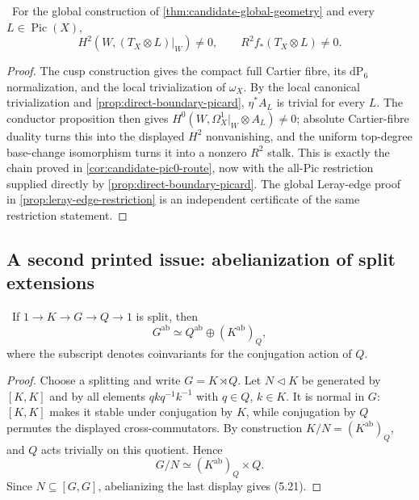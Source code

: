 \begin{corollary}
\label{cor:candidate-conductor-actual}
\Verified\ For the global construction of
\cref{thm:candidate-global-geometry} and every
$L\in\operatorname{Pic}(X)$,
\[
H^2(W,(T_X\otimes L)|_W)\ne0,
\qquad R^2f_*(T_X\otimes L)\ne0.
\]
\end{corollary}

\begin{proof}
The cusp construction gives the compact full Cartier fibre, its
$\mathrm{dP}_6$ normalization, and the local trivialization of $\omega_X$.
By the local canonical trivialization and
\cref{prop:direct-boundary-picard}, $\eta^*A_L$ is trivial for every $L$.
The conductor proposition then gives
$H^0(W,\Omega_X^1|_W\otimes A_L)\ne0$; absolute Cartier-fibre duality turns
this into the displayed $H^2$ nonvanishing, and the uniform top-degree
base-change isomorphism turns it into a nonzero $R^2$ stalk.  This is exactly
the chain proved in \cref{cor:candidate-pic0-route}, now with the all-Pic
restriction supplied directly by \cref{prop:direct-boundary-picard}.  The
global Leray-edge proof in \cref{prop:leray-edge-restriction} is an
independent certificate of the same restriction statement.
\end{proof}

\subsection{A second printed issue: abelianization of split extensions}

\begin{lemma}
\label{lem:semidirect-abelianization}
\Verified\ If
$1\to K\to G\to Q\to1$ is split, then
\[
G^{\mathrm{ab}}\simeq
Q^{\mathrm{ab}}\oplus(K^{\mathrm{ab}})_Q,
\tag{5.21}
\]
where the subscript denotes coinvariants for the conjugation action of $Q$.
\end{lemma}

\begin{proof}
Choose a splitting and write $G=K\rtimes Q$.  Let $N\triangleleft K$ be
generated by $[K,K]$ and by all elements
$qkq^{-1}k^{-1}$ with $q\in Q$, $k\in K$.  It is normal in $G$:
$[K,K]$ makes it stable under conjugation by $K$, while conjugation by
$Q$ permutes the displayed cross-commutators.  By construction
$K/N=(K^{\mathrm{ab}})_Q$, and $Q$ acts trivially on this quotient.  Hence
\[
G/N\simeq(K^{\mathrm{ab}})_Q\times Q.
\]
Since $N\subseteq[G,G]$, abelianizing the last display gives (5.21).
\end{proof}

